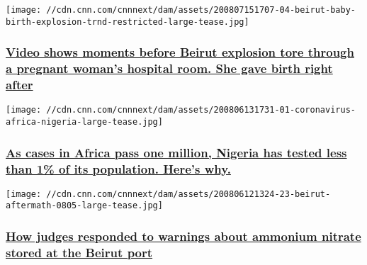 \texttt{[image: //cdn.cnn.com/cnnnext/dam/assets/200807151707-04-beirut-baby-birth-explosion-trnd-restricted-large-tease.jpg]}

\hypertarget{video-shows-moments-before-beirut-explosion-tore-through-a-pregnant-womans-hospital-room-she-gave-birth-right-after}{%
\subsubsection{\texorpdfstring{\href{/2020/08/07/world/beirut-explosion-baby-birth-trnd/index.html}{Video
shows moments before Beirut explosion tore through a pregnant woman's
hospital room. She gave birth right
after}}{Video shows moments before Beirut explosion tore through a pregnant woman's hospital room. She gave birth right after}}\label{video-shows-moments-before-beirut-explosion-tore-through-a-pregnant-womans-hospital-room-she-gave-birth-right-after}}

\href{/2020/08/07/africa/africa-surpasses-one-million-cases-intl/index.html}{}

\texttt{[image: //cdn.cnn.com/cnnnext/dam/assets/200806131731-01-coronavirus-africa-nigeria-large-tease.jpg]}

\hypertarget{as-cases-in-africa-pass-one-million-nigeria-has-tested-less-than-1-of-its-population-heres-why-1}{%
\subsubsection{\texorpdfstring{\href{/2020/08/07/africa/africa-surpasses-one-million-cases-intl/index.html}{As
cases in Africa pass one million, Nigeria has tested less than 1\% of
its population. Here's
why.}}{As cases in Africa pass one million, Nigeria has tested less than 1\% of its population. Here's why.}}\label{as-cases-in-africa-pass-one-million-nigeria-has-tested-less-than-1-of-its-population-heres-why-1}}

\href{/2020/08/06/middleeast/lebanon-explosion-ministry-of-justice-intl/index.html}{}

\texttt{[image: //cdn.cnn.com/cnnnext/dam/assets/200806121324-23-beirut-aftermath-0805-large-tease.jpg]}

\hypertarget{how-judges-responded-to-warnings-about-ammonium-nitrate-stored-at-the-beirut-port}{%
\subsubsection{\texorpdfstring{\href{/2020/08/06/middleeast/lebanon-explosion-ministry-of-justice-intl/index.html}{How
judges responded to warnings about ammonium nitrate stored at the Beirut
port}}{How judges responded to warnings about ammonium nitrate stored at the Beirut port}}\label{how-judges-responded-to-warnings-about-ammonium-nitrate-stored-at-the-beirut-port}}

